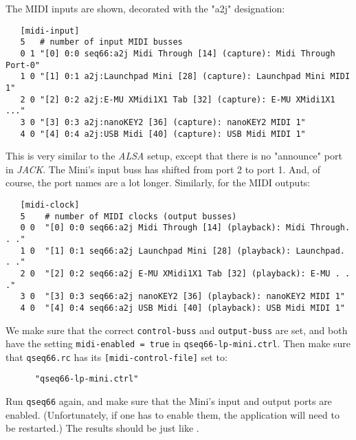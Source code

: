    The MIDI inputs are shown, decorated with the "a2j" designation:

   \begin{verbatim}
   [midi-input]
   5   # number of input MIDI busses
   0 1 "[0] 0:0 seq66:a2j Midi Through [14] (capture): Midi Through Port-0"
   1 0 "[1] 0:1 a2j:Launchpad Mini [28] (capture): Launchpad Mini MIDI 1"
   2 0 "[2] 0:2 a2j:E-MU XMidi1X1 Tab [32] (capture): E-MU XMidi1X1 ..."
   3 0 "[3] 0:3 a2j:nanoKEY2 [36] (capture): nanoKEY2 MIDI 1"
   4 0 "[4] 0:4 a2j:USB Midi [40] (capture): USB Midi MIDI 1"
   \end{verbatim}

   This is very similar to the \textsl{ALSA} setup, except that there is no
   "announce" port in \textsl{JACK}.  The Mini's input buss has shifted from
   port 2 to port 1.  And, of course, the port names are a lot
   longer.  Similarly, for the MIDI outputs:

   \begin{verbatim}
   [midi-clock]
   5    # number of MIDI clocks (output busses)
   0 0  "[0] 0:0 seq66:a2j Midi Through [14] (playback): Midi Through. . ."
   1 0  "[1] 0:1 seq66:a2j Launchpad Mini [28] (playback): Launchpad. . ."
   2 0  "[2] 0:2 seq66:a2j E-MU XMidi1X1 Tab [32] (playback): E-MU . . ."
   3 0  "[3] 0:3 seq66:a2j nanoKEY2 [36] (playback): nanoKEY2 MIDI 1"
   4 0  "[4] 0:4 seq66:a2j USB Midi [40] (playback): USB Midi MIDI 1"
   \end{verbatim}

   We make sure that the correct \texttt{control-buss} and
   \texttt{output-buss} are set, and both have the setting
   \texttt{midi-enabled = true} in \texttt{qseq66-lp-mini.ctrl}.
   Then make sure that \texttt{qseq66.rc} has its
   \texttt{[midi-control-file]} set to:

   \begin{verbatim}
      "qseq66-lp-mini.ctrl"
   \end{verbatim}

   Run \texttt{qseq66} again, and make sure that the Mini's input and output
   ports are enabled. (Unfortunately, if one has to enable them, the
   application will need to be restarted.)
   The results should be just like
   .

